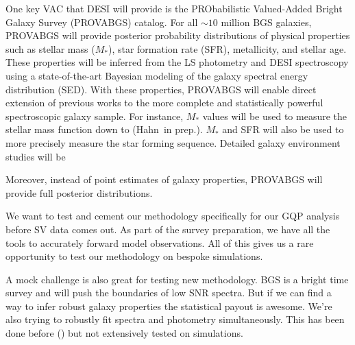 One key VAC that DESI will provide is the PRObabilistic Valued-Added Bright
Galaxy Survey (PROVABGS) catalog. 
For all ${\sim}10$ million BGS galaxies, PROVABGS will provide posterior
probability distributions of physical properties such as stellar mass ($M_*$),
star formation rate (SFR), metallicity, and stellar age. 
These properties will be inferred from the LS photometry and DESI spectroscopy
using a state-of-the-art Bayesian modeling of the galaxy spectral energy
distribution (SED). 
With these properties, PROVABGS will enable direct extension of previous works
to the more complete and statistically powerful spectroscopic galaxy sample. 
For instance, $M_*$ values will be used to measure the stellar mass function
down to  (Hahn\etal~in prep.). 
$M_*$ and SFR will also be used to more precisely measure the star forming
sequence.
Detailed galaxy environment studies will be 

Moreover, instead of point estimates of galaxy properties, PROVABGS will
provide full posterior distributions. 


We want to test and cement our methodology specifically for our GQP 
analysis before SV data comes out. 
As part of the survey preparation, we have all the tools to accurately 
forward model observations. 
All of this gives us a rare opportunity to test our methodology on bespoke
simulations. 

A mock challenge is also great for testing new methodology.
BGS is a bright time survey and will push the boundaries of low SNR 
spectra. But if we can find a way to  infer robust galaxy properties the 
statistical payout is awesome.  
We're also trying to robustly fit spectra and photometry simultaneously. 
This has been done before () but not extensively tested 
on simulations. 


